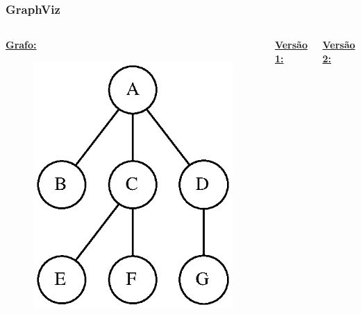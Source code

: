 \documentclass[aspectratio=169]{beamer}
\begin{document}
\begin{frame}[fragile]\frametitle{GraphViz}
\begin{columns}[T]
\begin{column}{0.3\linewidth}
\textbf{\underline{Grafo:}}\\
\begin{figure}[h]
	\centering
	\includegraphics[height=0.4\paperheight]{imagens/arvore_a.eps}
\end{figure}
\end{column}
\begin{column}{0.35\linewidth}
\textbf{\underline{Versão 1:}}\\

\end{column}
\begin{column}{0.35\linewidth}
\textbf{\underline{Versão 2:}}\\

\end{column}
\end{columns}
\end{frame}

\end{document}
